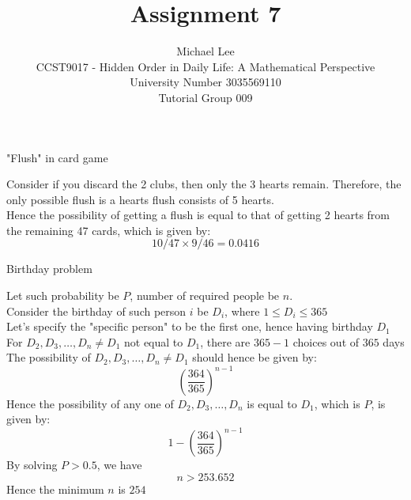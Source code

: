 \documentclass[12pt]{article}
\newenvironment{question}[2][Question]{\begin{trivlist}
    \item[\hskip \labelsep {\bfseries #1}\hskip \labelsep {\bfseries #2.}]}{\end{trivlist}}
\newenvironment{answer}[2][Answer]{\begin{trivlist}
    \item[\hskip \labelsep {\bfseries #1}\hskip \labelsep {\bfseries #2.}]}{\end{trivlist}}
\begin{document}


\title{Assignment 7}%
\author{Michael Lee\\ %
	CCST9017 - Hidden Order in Daily Life: A Mathematical Perspective \\
	University Number 3035569110 \\
	Tutorial Group 009
} %


\maketitle

\begin{question}{Q. 1}
	"Flush" in card game
\end{question}
\begin{answer}{Q. 1}\end{answer}
Consider if you discard the 2 clubs, then only the 3 hearts remain. Therefore, the only possible flush is a hearts flush consists of 5 hearts. \\
Hence the possibility of getting a flush is equal to that of getting 2 hearts from the remaining 47 cards, which is given by:
\begin{equation}
	10/47 \times 9/46 = 0.0416
\end{equation}

\begin{question}{Q. 2}
	Birthday problem
\end{question}
\begin{answer}{Q. 2}\end{answer}
Let such probability be $P$, number of required people be $n$.  \\
Consider the birthday of such person $i$ be $D_i$, where $1\leq D_i \leq 365$  \\
Let's specify the "specific person" to be the first one, hence having birthday $D_1$  \\
For $D_2, D_3 , \dots , D_n \neq D_1$ not equal to $D_1$, there are $365-1$ choices out of $365$ days  \\
The possibility of $D_2, D_3 , \dots , D_n \neq D_1$ should hence be given by:
\begin{equation}
    \left(\frac{364}{365}\right)^{n - 1}
\end{equation}
Hence the possibility of any one of $D_2, D_3 , \dots , D_n$ is equal to $D_1$, which is $P$, is given by:  
\begin{equation}
    1-\left(\frac{364}{365}\right)^{n - 1}
\end{equation}
By solving $P>0.5$, we have
\begin{equation}
    n > 253.652
\end{equation}
Hence the minimum $n$ is $254$

\end{document}
